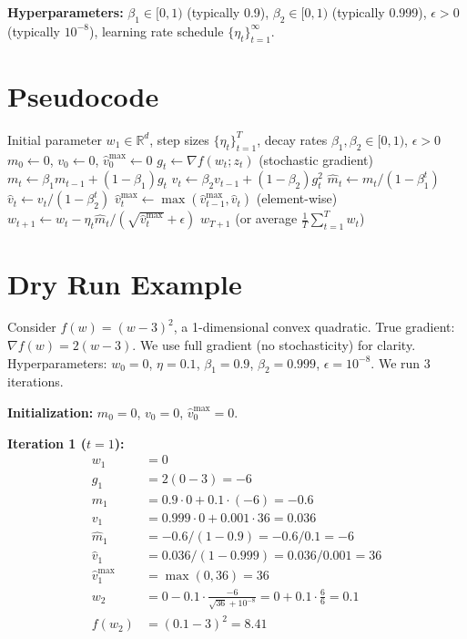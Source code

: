 \documentclass{article}
\begin{document}
\textbf{Hyperparameters:} $\beta_1 \in [0,1)$ (typically 0.9), $\beta_2 \in [0,1)$ (typically 0.999), $\epsilon > 0$ (typically $10^{-8}$), learning rate schedule $\{\eta_t\}_{t=1}^\infty$.

\section*{Pseudocode}

\begin{algorithm}
\caption{AMSGrad}
\begin{algorithmic}
\REQUIRE Initial parameter $w_1 \in \mathbb{R}^d$, step sizes $\{\eta_t\}_{t=1}^T$, decay rates $\beta_1, \beta_2 \in [0,1)$, $\epsilon > 0$
\STATE $m_0 \leftarrow 0$, $v_0 \leftarrow 0$, $\hat{v}_0^{\text{max}} \leftarrow 0$
    \STATE $g_t \leftarrow \nabla f(w_t; z_t)$ \quad (stochastic gradient)
    \STATE $m_t \leftarrow \beta_1 m_{t-1} + (1 - \beta_1) g_t$
    \STATE $v_t \leftarrow \beta_2 v_{t-1} + (1 - \beta_2) g_t^2$
    \STATE $\hat{m}_t \leftarrow m_t / (1 - \beta_1^t)$
    \STATE $\hat{v}_t \leftarrow v_t / (1 - \beta_2^t)$
    \STATE $\hat{v}_t^{\text{max}} \leftarrow \max(\hat{v}_{t-1}^{\text{max}}, \hat{v}_t)$ \quad (element-wise)
    \STATE $w_{t+1} \leftarrow w_t - \eta_t \hat{m}_t / (\sqrt{\hat{v}_t^{\text{max}}} + \epsilon)$
\ENDFOR
\RETURN $w_{T+1}$ (or average $\frac{1}{T}\sum_{t=1}^T w_t$)
\end{algorithmic}
\end{algorithm}

\section*{Dry Run Example}

Consider $f(w) = (w - 3)^2$, a 1-dimensional convex quadratic. True gradient: $\nabla f(w) = 2(w - 3)$. We use full gradient (no stochasticity) for clarity. Hyperparameters: $w_0 = 0$, $\eta = 0.1$, $\beta_1 = 0.9$, $\beta_2 = 0.999$, $\epsilon = 10^{-8}$. We run 3 iterations.

\textbf{Initialization:} $m_0 = 0$, $v_0 = 0$, $\hat{v}_0^{\text{max}} = 0$.

\textbf{Iteration 1 ($t=1$):}
\begin{align*}
    w_1 &= 0 \\
    g_1 &= 2(0 - 3) = -6 \\
    m_1 &= 0.9 \cdot 0 + 0.1 \cdot (-6) = -0.6 \\
    v_1 &= 0.999 \cdot 0 + 0.001 \cdot 36 = 0.036 \\
    \hat{m}_1 &= -0.6 / (1 - 0.9) = -0.6 / 0.1 = -6 \\
    \hat{v}_1 &= 0.036 / (1 - 0.999) = 0.036 / 0.001 = 36 \\
    \hat{v}_1^{\text{max}} &= \max(0, 36) = 36 \\
    w_2 &= 0 - 0.1 \cdot \frac{-6}{\sqrt{36} + 10^{-8}} = 0 + 0.1 \cdot \frac{6}{6} = 0.1 \\
    f(w_2) &= (0.1 - 3)^2 = 8.41
\end{align*}
\end{document}
